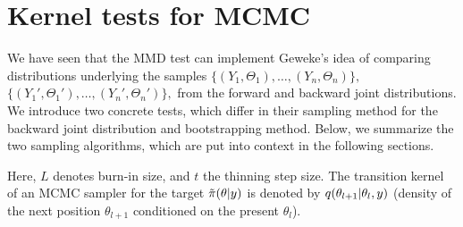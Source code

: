 \documentclass{article}
\newcommand{\tildepi}{\tilde{\pi}}
\begin{document}
\section{Kernel tests for MCMC}
We have seen that the MMD test can implement Geweke's idea of comparing distributions underlying the samples $\{(Y_1,\Theta_1),\ldots,(Y_n,\Theta_n)\}, $ $\{(Y_1',\Theta_1'),\ldots,(Y_n',\Theta_n')\}, $ from the forward and backward joint distributions. 
We introduce two concrete tests, which differ in their sampling method for the backward joint distribution and bootstrapping method. 
Below, we summarize the two sampling algorithms, which are put into context in the following sections. 

Here, $L$ denotes burn-in size, and $t$ the thinning step size. The transition kernel of an MCMC sampler for the target $\tildepi(\theta\given y)$ is denoted by $q(\theta_{l+1} \vert \theta_l, y)$ (density of the next position $\theta_{l+1}$ conditioned on the present $\theta_l$). 
\end{document}
